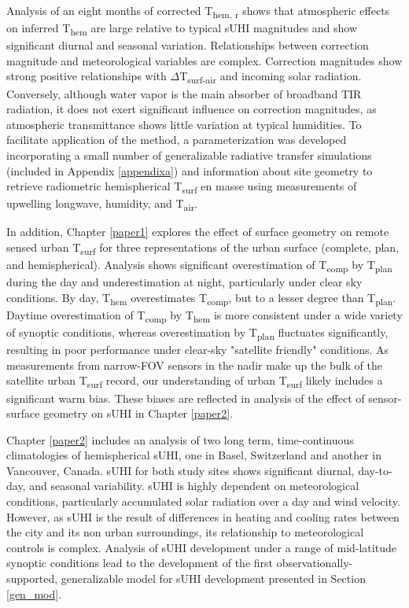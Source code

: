 \begin{bibunit}
Analysis of an eight months of corrected T\textsubscript{hem, r} shows that atmospheric effects on inferred T\textsubscript{hem} are large relative to typical sUHI magnitudes and show significant diurnal and seasonal variation. Relationships between correction magnitude and meteorological variables are complex. Correction magnitudes show strong positive relationships with $\Delta$T\textsubscript{surf-air} and incoming solar radiation. Conversely, although water vapor is the main absorber of broadband TIR radiation, it does not exert significant influence on correction magnitudes, as atmospheric transmittance shows little variation at typical humidities. To facilitate application of the method, a parameterization was developed incorporating a small number of generalizable radiative transfer simulations (included in Appendix \ref{appendixa}) and information about site geometry to retrieve radiometric hemispherical T\textsubscript{surf} en masse using measurements of upwelling longwave, humidity, and T\textsubscript{air}. 

In addition, Chapter \ref{paper1} explores the effect of surface geometry on remote sensed urban T\textsubscript{surf} for three representations of the urban surface (complete, plan, and hemispherical). Analysis shows significant overestimation of T\textsubscript{comp} by T\textsubscript{plan} during the day and underestimation at night, particularly under clear sky conditions. By day, T\textsubscript{hem} overestimates T\textsubscript{comp}, but to a lesser degree than T\textsubscript{plan}. Daytime overestimation of T\textsubscript{comp} by T\textsubscript{hem} is more consistent under a wide variety of synoptic conditions, whereas overestimation by T\textsubscript{plan} fluctuates significantly, resulting in poor performance under clear-sky "satellite friendly" conditions. As measurements from narrow-FOV sensors in the nadir make up the bulk of the satellite urban T\textsubscript{surf} record, our understanding of urban T\textsubscript{surf} likely includes a significant warm bias. These biases are reflected in analysis of the effect of sensor-surface geometry on sUHI in Chapter \ref{paper2}.

Chapter \ref{paper2} includes an analysis of two long term, time-continuous climatologies of hemispherical sUHI, one in Basel, Switzerland and another in Vancouver, Canada. sUHI for both study sites shows significant diurnal, day-to-day, and seasonal variability. sUHI is highly dependent on meteorological conditions, particularly accumulated solar radiation over a day and wind velocity. However, as sUHI is the result of differences in heating and cooling rates between the city and its non urban surroundings, its relationship to meteorological controls is complex. Analysis of sUHI development under a range of mid-latitude synoptic conditions lead to the development of the first observationally-supported, generalizable model for sUHI development presented in Section \ref{gen_mod}.


\end{bibunit}
